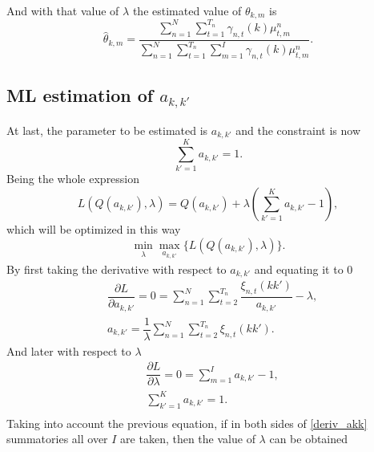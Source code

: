 \documentclass[12pt]{article}
\begin{document}
And with that value of $\lambda$ the estimated value of $\theta_{k,m}$ is
\begin{equation}
\widehat{\theta}_{k,m} = \dfrac{\sum \limits_{n=1}^{N} \sum \limits_ { t = 1 } ^ { T _ { n } }\gamma_{n,t}(k)\mu_{t,m}^{n}}{\sum \limits_{n=1}^{N}\sum \limits_ { t = 1 } ^ { T _ { n } }\sum \limits_{m=1}^{I}\gamma_{n,t}(k)\mu_{t,m}^{n}}.
\end{equation}
\subsection{ML estimation of $a_{k,k'}$}
At last, the parameter to be estimated is $a_{k,k'}$ and the constraint is now
\begin{equation}
\label{constraint_akk}
\sum \limits_{k'=1}^{K} a_{k,k'} = 1.
\end{equation}
Being the whole expression
\begin{equation}
\label{lagrange_akk}
L\left( Q(a_{k,k'}),\lambda \right) = Q(a_{k,k'}) + \lambda \left( \sum \limits_{k'=1}^{K} a_{k,k'} - 1 \right),
\end{equation}
which will be optimized in this way
\begin{equation}
\label{minmax_lagrange_akk}
\min_{\substack{\lambda}} \max_{\substack{a_{k,k'}}} \lbrace L\left( Q(a_{k,k'}),\lambda \right) \rbrace.
\end{equation}
By first taking the derivative with respect to $a_{k,k'}$ and equating it to 0
\begin{equation}
\label{deriv_akk}
\begin{split}
& \dfrac{\partial L}{\partial a_{k,k'}} = 0 = \sum \limits_{n=1}^{N}\sum _ { t = 2 } ^ { T _ { n } } \dfrac{\xi_{n,t}(kk')}{a_{k,k'}} - \lambda, \\
& a_{k,k'} = \dfrac{1}{\lambda} \sum \limits_{n=1}^{N} \sum _ { t = 2 } ^ { T _ { n } }\xi_{n,t}(kk').
\end{split}
\end{equation}
And later with respect to $\lambda$
\begin{equation}
\begin{split}
& \dfrac{\partial L}{\partial \lambda} = 0 = \sum \limits_{m=1}^{I} a_{k,k'} - 1,\\
& \sum \limits_{k'=1}^{K} a_{k,k'} = 1.\\
\end{split}
\end{equation}
Taking into account the previous equation, if in both sides of \eqref{deriv_akk} summatories all over $I$ are taken, then the value of $\lambda$ can be obtained
\end{document}

